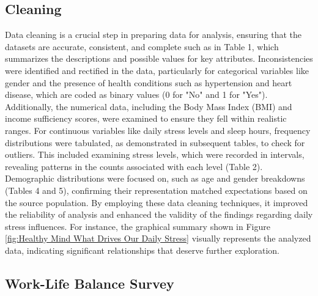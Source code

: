 \documentclass[runningheads]{llncs}
\begin{document}
\begin{enumerate}
\section{Cleaning}
Data cleaning is a crucial step in preparing data for analysis, ensuring that the datasets are accurate, consistent, and complete such as in Table 1, which summarizes the descriptions and possible values for key attributes. Inconsistencies were identified and rectified in the data, particularly for categorical variables like gender and the presence of health conditions such as hypertension and heart disease, which are coded as binary values (0 for "No" and 1 for "Yes"). Additionally, the numerical data, including the Body Mass Index (BMI) and income sufficiency scores, were examined to ensure they fell within realistic ranges. For continuous variables like daily stress levels and sleep hours, frequency distributions were tabulated, as demonstrated in subsequent tables, to check for outliers. This included examining stress levels, which were recorded in intervals, revealing patterns in the counts associated with each level (Table 2). Demographic distributions were focused on, such as age and gender breakdowns (Tables 4 and 5), confirming their representation matched expectations based on the source population. By employing these data cleaning techniques, it improved the reliability of analysis and enhanced the validity of the findings regarding daily stress influences. For instance, the graphical summary shown in Figure \ref{fig:Healthy Mind What Drives Our Daily Stress} visually represents the analyzed data, indicating significant relationships that deserve further exploration.

\subsection{Work-Life Balance Survey}


\end{enumerate}
\end{document}
